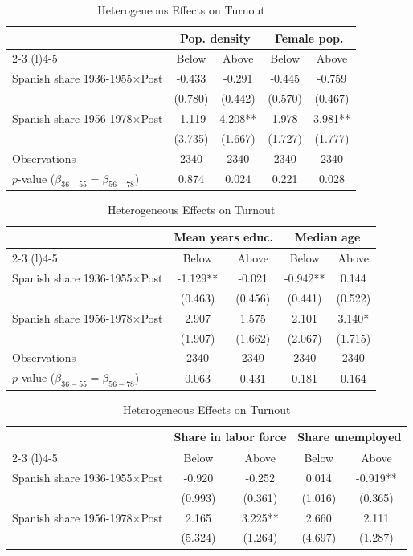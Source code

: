 \begin{table}[!h]
\centering
\renewcommand{\arraystretch}{1.05}
\setlength{\tabcolsep}{8pt}
\captionsetup{justification=centering}
\caption{Heterogeneous Effects on Turnout}
\begin{tabular*}{\textwidth}{l@{\extracolsep{\fill}}cccc}
\hline
 & \multicolumn{2}{c}{Pop. density} & \multicolumn{2}{c}{Female pop.} \\
\cmidrule(l){2-3} \cmidrule(l){4-5}
  & Below & Above & Below  & Above \\
\hline
Spanish share 1936-1955$\times$Post & -0.433 & -0.291 & -0.445 & -0.759\\
 & (0.780) & (0.442) & (0.570) & (0.467)\\
Spanish share 1956-1978$\times$Post & -1.119 & 4.208** & 1.978 & 3.981**\\
 & (3.735) & (1.667) & (1.727) & (1.777)\\

\addlinespace
Observations & 2340 & 2340 & 2340 & 2340\\
$p$-value ($\beta_{36{-}55} = \beta_{56{-}78}$) & 0.874 & 0.024 & 0.221 & 0.028\\
\hline
\end{tabular*}
\begin{tabular*}{\textwidth}{l@{\extracolsep{\fill}}cccc}
 & \multicolumn{2}{c}{Mean years educ.} & \multicolumn{2}{c}{Median age} \\
\cmidrule(l){2-3} \cmidrule(l){4-5}
  & Below & Above & Below  & Above \\
\hline
Spanish share 1936-1955$\times$Post & -1.129** & -0.021 & -0.942** & 0.144\\
 & (0.463) & (0.456) & (0.441) & (0.522)\\
Spanish share 1956-1978$\times$Post & 2.907 & 1.575 & 2.101 & 3.140*\\
 & (1.907) & (1.662) & (2.067) & (1.715)\\

\addlinespace
Observations & 2340 & 2340 & 2340 & 2340\\
$p$-value ($\beta_{36{-}55} = \beta_{56{-}78}$) & 0.063 & 0.431 & 0.181 & 0.164\\
\hline
\end{tabular*}
\begin{tabular*}{\textwidth}{l@{\extracolsep{\fill}}cccc}
 & \multicolumn{2}{c}{Share in labor force} & \multicolumn{2}{c}{Share unemployed} \\
\cmidrule(l){2-3} \cmidrule(l){4-5}
  & Below & Above & Below  & Above \\
\hline
Spanish share 1936-1955$\times$Post & -0.920 & -0.252 & 0.014 & -0.919**\\
 & (0.993) & (0.361) & (1.016) & (0.365)\\
Spanish share 1956-1978$\times$Post & 2.165 & 3.225** & 2.660 & 2.111\\
 & (5.324) & (1.264) & (4.697) & (1.287)\\


\end{tabular*}
\end{table}
